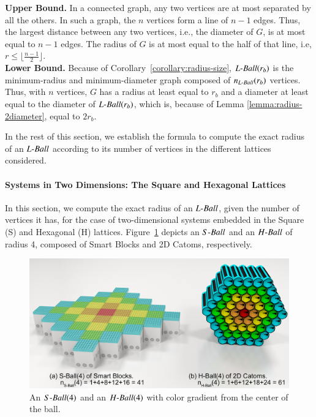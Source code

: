 \begin{pf}
	\textbf{Upper Bound.} In a connected graph, any two vertices are at most separated by all the others. In such a graph, the $n$ vertices form a line of $n-1$ edges. Thus, the largest distance between any two vertices, i.e., the diameter of $G$, is at most equal to $n-1$ edges. The radius of $G$ is at most equal to the half of that line, i.e, $r \leq \lfloor \frac{n-1}{2} \rfloor$.\\
	\noindent\textbf{Lower Bound.} Because of Corollary~\ref{corollary:radius-size}, $\mathop{L{\textnormal{-}Ball}}(r_b)$ is the minimum-radius and minimum-diameter graph composed of $n_{\mathop{L{\textnormal{-}Ball}}}(r_b)$ vertices. Thus, with $n$ vertices, $G$ has a radius at least equal to $r_b$ and a diameter at least equal to the diameter of $\mathop{L{\textnormal{-}Ball}}(r_b)$, which is, because of Lemma \ref{lemma:radius-2diameter}, equal to $2 r_b$.
\end{pf}

In the rest of this section, we establish the formula to compute the exact radius of an $\mathop{L{\textnormal{-}Ball}}$ according to its number of vertices in the different lattices considered.

\paragraph{Systems in Two Dimensions: The Square and Hexagonal Lattices}

In this section, we compute the exact radius of an $\mathop{L{\textnormal{-}Ball}}$, given the number of vertices it has, for the case of two-dimensional systems embedded in the Square (S) and Hexagonal (H) lattices. Figure~\ref{fig:appendixLMRs:s-h-ball} depicts an $\mathop{S{\textnormal{-}Ball}}$ and an $\mathop{H{\textnormal{-}Ball}}$ of radius 4, composed of Smart Blocks and 2D Catoms, respectively.

\begin{figure}[!h]
	\centering
	\includegraphics[width=0.65\linewidth]{images/network-characterization/ball-smartblocks-2dcatoms.png}
	\caption{An $\mathop{S{\textnormal{-}Ball}}(4)$ and an $\mathop{H{\textnormal{-}Ball}}(4)$ with color gradient from the center of the ball.\label{fig:appendixLMRs:s-h-ball}}
\end{figure}

